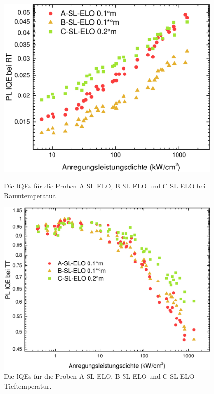 \begin{figure}[htb]
  \centering
  \begin{minipage}[t]{0.49\textwidth}
    \centering
    \includegraphics[width=\textwidth]{Bilder/TS4048/corrIQERT.pdf}
		\caption{Die IQEs für die Proben A-SL-ELO, B-SL-ELO und C-SL-ELO bei Raumtemperatur.}
    \label{fig:sleloiqeRT}
  \end{minipage}
	\hfill
  \begin{minipage}[t]{0.49\textwidth}
    \centering
    \includegraphics[width=\linewidth]{Bilder/TS4048/IQETT.pdf}
		\caption{Die IQEs für die Proben A-SL-ELO, B-SL-ELO und C-SL-ELO Tieftemperatur.}
    \label{fig:slelocorriqeRT}
  \end{minipage}
\end{figure}
